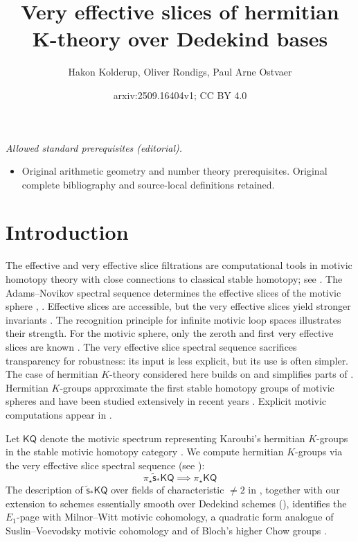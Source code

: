 \documentclass[11pt,hyp,english]{article}
\title{Very effective slices of hermitian K-theory over Dedekind bases}
\author{Hakon Kolderup, Oliver Rondigs, Paul Arne Ostvaer}
\date{arxiv:2509.16404v1; CC BY 4.0}
\newcommand{\KQ}{\mathsf{KQ}}
\newcommand{\vs}{\tilde{\mathsf{s}}}
\theoremstyle{definition}
\begin{document}
\maketitle
\noindent\textit{Allowed standard prerequisites (editorial).}\begin{itemize}
\item Original arithmetic geometry and number theory prerequisites. Original complete bibliography and source-local definitions retained.
\end{itemize}\medskip
\section{Introduction}
\label{section:introduction}

The effective and very effective slice filtrations are computational tools in motivic homotopy theory with close connections to classical stable homotopy; see \cite{zbMATH07303324,levine.comparison,zbMATH02078162}. The Adams–Novikov spectral sequence determines the effective slices of the motivic sphere \cite[Conjecture 8.1]{levine.comparison}, \cite[Theorem 2.12]{zbMATH07003144}. Effective slices are accessible, but the very effective slices yield stronger invariants \cite{SO:twisted}. The recognition principle for infinite motivic loop spaces \cite{zbMATH07422194,zbMATH07733647} illustrates their strength. For the motivic sphere, only the zeroth and first very effective slices are known \cite[Theorem 3.30]{2020arXiv200506778B}.
The very effective slice spectral sequence sacrifices transparency for robustness: its input is less explicit, but its use is often simpler. The case of hermitian $K$-theory considered here builds on \cite{Bachmann} and simplifies parts of \cite{KRO}. Hermitian $K$-groups approximate the first stable homotopy groups of motivic spheres \cite{MorelICM06,zbMATH07003144,zbMATH07858209} and have been studied extensively in recent years \cite{9.I,9.II,9.III,dfjk,2019arXiv191111682H,zbMATH07623470}. Explicit motivic computations appear in \cite{berrick-karoubi,zbMATH05840069,zbMATH06261120,zbMATH05930233,zbMATH06433290,zbMATH07585647,zbMATH07352278,KRO,zbMATH07124513}.

\vspace{0.1in}

Let $\KQ$ denote the motivic spectrum representing Karoubi’s hermitian $K$-groups in the stable motivic homotopy category \cite{chn,hornbostel}. We compute hermitian $K$-groups via the very effective slice spectral sequence \cite{SO:twisted} (see ):
\begin{equation}
\label{equation:vesssforKQ}
\pi_{\star}\vs_{\ast}\KQ \implies \pi_{\star}\KQ 
\end{equation}
The description of $\vs_{\ast}\KQ$ over fields of characteristic $\neq 2$ in \cite[Theorem 16]{Bachmann}, together with our extension to schemes essentially smooth over Dedekind schemes (), identifies the $E_{1}$-page with Milnor–Witt motivic cohomology, a quadratic form analogue of Suslin–Voevodsky motivic cohomology and of Bloch’s higher Chow groups \cite{2020arXiv200406634B}.
\end{document}
